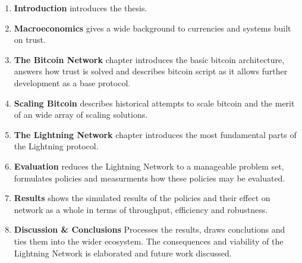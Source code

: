 \begin{enumerate}
	\item \textbf{Introduction} introduces the thesis.
	\item \textbf{Macroeconomics} gives a wide background to currencies and systems built on trust. 
	\item \textbf{The Bitcoin Network} chapter introduces the basic bitcoin architecture, answers how trust is solved and describes bitcoin script as it allows further development as a base protocol.
	\item \textbf{Scaling Bitcoin} describes historical attempts to scale bitcoin and the merit of an wide array of scaling solutions.
	\item \textbf{The Lightning Network} chapter introduces the most fundamental parts of the Lightning protocol.
	\item \textbf{Evaluation} reduces the Lightning Network to a manageable problem set, formulates policies and measurments how these policies may be evaluated.
	\item \textbf{Results} shows the simulated results of the policies and their effect on network as a whole in terms of throughput, efficiency and robustness.
	\item \textbf{Discussion \& Conclusions} Processes the results, draws conclutions and ties them into the wider ecosystem. The consequences and viability of the Lightning Network is elaborated and future work discussed. 
\end{enumerate}